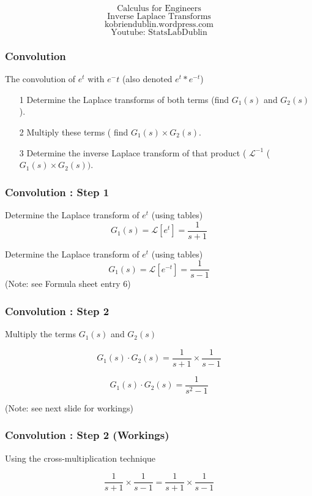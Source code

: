 \documentclass{beamer}
\begin{document}
\begin{frame}
\bigskip
{
\Huge
\[ \mbox{Calculus for Engineers}\]
\[ \mbox{Inverse Laplace Transforms}\]
}
{
\Large
\[ \mbox{kobriendublin.wordpress.com}\]
\[ \mbox{Youtube: StatsLabDublin}\]
}
\end{frame}

\begin{frame}
\frametitle{Convolution}
The convolution of $e^t$ with $e^-t$ (also denoted $e^t \ast e^{-t}$)

\begin{itemize}
\item[1] Determine the Laplace transforms of both terms (find $G_1(s)$ and $G_2(s)$).
\item[2] Multiply these terms ( find $G_1(s) \times G_2(s)$.
\item[3] Determine the inverse Laplace transform of that product ( $\mathcal{L}^{-1}$ ($G_1(s) \times G_2(s)) $.
\end{itemize}

\end{frame}
\begin{frame}
\frametitle{Convolution : Step 1}

Determine the Laplace transform of $e^t$ (using tables)
\[
G_1(s) = \mathcal{L}[ e^t ] = \frac{1}{s+1}
\]

Determine the Laplace transform of $e^t$ (using tables)
\[
G_1(s) = \mathcal{L}[ e^{-t} ] = \frac{1}{s-1}
\]
(Note: see Formula sheet entry 6)
\end{frame}



\begin{frame}
\frametitle{Convolution : Step 2}
\Large
Multiply the terms $G_1(s)$ and $G_2(s)$

\[ G_1(s)\cdot G_2(s) = \frac{1}{s+1}\times \frac{1}{s-1} \]

\[ G_1(s)\cdot G_2(s) =  \frac{1}{s^2-1}\]

(Note: see next slide for workings)
\end{frame}

\begin{frame}
\frametitle{Convolution : Step 2 (Workings) }
\LARGE

Using the cross-multiplication technique

\[ \frac{1}{s+1}\times \frac{1}{s-1} = \frac{1}{s+1}\times \frac{1}{s-1} \]


\end{frame}
\end{document}
